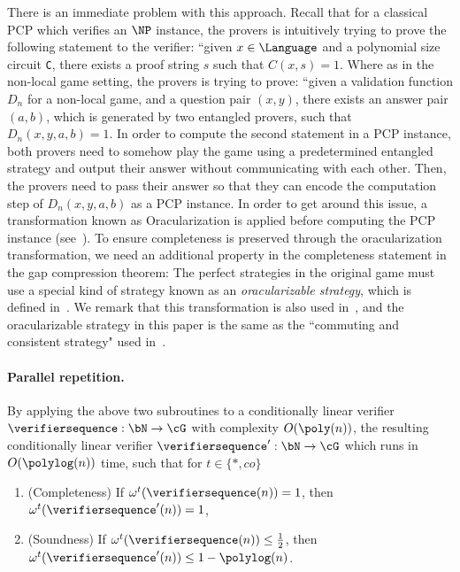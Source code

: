 There is an immediate problem with this approach. Recall that for a classical PCP which verifies an $\NP$ instance, the provers is intuitively trying to prove the following statement to the verifier:  ``given $x \in \Language$ and a polynomial size circuit \texttt{C}, there exists a proof string $s$ such that $C(x,s)=1$. Where as in the non-local game setting, the provers is trying to prove: ``given a validation function $D_n$ for a non-local game, and a question pair $(x,y)$, there exists an answer pair $(a,b)$, which is generated by two entangled provers, such that $D_n(x,y,a,b) = 1$. In order to compute the second statement in a PCP instance, both provers need to somehow play the game using a predetermined entangled strategy and output their answer without communicating with each other. Then, the provers need to pass their answer so that they can encode the computation step of $D_n(x,y,a,b)$ as a PCP instance. In order to get around this issue, a transformation known as Oracularization is applied before computing the PCP instance (see~). To ensure completeness is preserved through the oracularization transformation, we need an additional property in the completeness statement in the gap compression theorem: The perfect strategies in the original game must use a special kind of strategy known as an \textit{oracularizable strategy}, which is defined in~. We remark that this transformation is also used in~\cite{jiMIPRE2022a}, and the oracularizable strategy in this paper is the same as the ``commuting and consistent strategy" used in~\cite{jiMIPRE2022a}. 


\paragraph{Parallel repetition. } By applying the above two subroutines to a conditionally linear verifier $\verifiersequence: \bN \rightarrow \cG$ with complexity $O(\poly(n))$, the resulting conditionally linear verifier $\verifiersequence': \bN \rightarrow \cG$  which runs in $O(\polylog(n))$ time, such that for $t \in \{*, co \}$
\begin{enumerate}
	\item (Completeness) If $\omega^{t}(\verifiersequence(n)) = 1$, then $\omega^{t}(\verifiersequence'(n)) = 1$, 
	\item (Soundness) If $\omega^{t}(\verifiersequence(n)) \leq \frac{1}{2}$, then $\omega^{t}(\verifiersequence'(n)) \leq 1 - \polylog(n)$. 
\end{enumerate}

